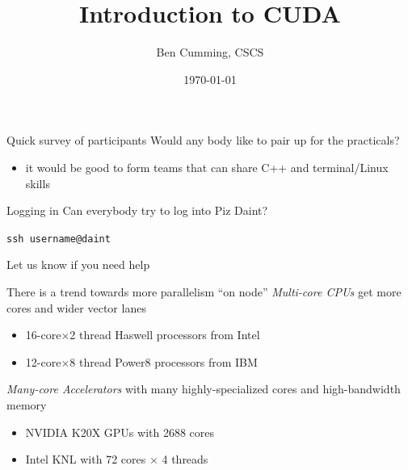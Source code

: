 \documentclass[aspectratio=43]{beamer}
\author{Ben Cumming, CSCS}
\title{Introduction to CUDA}
\subtitle{}
\date{\today}
\begin{document}
\cscstitle


\begin{frame}[fragile]{}
    \begin{info}{Quick survey of participants}
        Would any body like to pair up for the practicals?
        \begin{itemize}
            \item it would be good to form teams that can share C++ and terminal/Linux skills
        \end{itemize}
    \end{info}

    \begin{info}{Logging in}
        Can everybody try to log into Piz Daint?
        \begin{center}
            \verb!ssh username@daint!
        \end{center}
        Let us know if you need help
    \end{info}

\end{frame}


\begin{frame}[fragile]{}
    \begin{info}{There is a trend towards more parallelism ``on node''}
        \emph{Multi-core CPUs} get more cores and wider vector lanes
        \begin{itemize}
            \item 16-core$\times$2 thread Haswell processors from Intel
            \item 12-core$\times$8 thread Power8 processors from IBM
        \end{itemize}
        \emph{Many-core Accelerators} with many highly-specialized cores and high-bandwidth memory
        \begin{itemize}
            \item NVIDIA K20X GPUs with 2688 cores
            \item Intel KNL with 72 cores $\times$ 4 threads
        \end{itemize}
    \end{info}

\end{frame}
\end{document}

